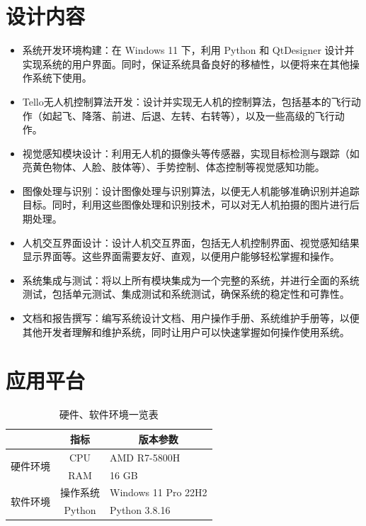 \documentclass[report, twoside, UTF8, AutoFakeBold = 1, AutoFakeSlant, zihao = -4]{config}
\begin{document}
\section{设计内容}

\begin{itemize}
    \item 系统开发环境构建：在 Windows 11 下，利用 Python 和 QtDesigner 设计并实现系统的用户界面。同时，保证系统具备良好的移植性，以便将来在其他操作系统下使用。

    \item Tello无人机控制算法开发：设计并实现无人机的控制算法，包括基本的飞行动作（如起飞、降落、前进、后退、左转、右转等），以及一些高级的飞行动作。
    
    \item 视觉感知模块设计：利用无人机的摄像头等传感器，实现目标检测与跟踪（如亮黄色物体、人脸、肢体等）、手势控制、体态控制等视觉感知功能。
    
    \item 图像处理与识别：设计图像处理与识别算法，以便无人机能够准确识别并追踪目标。同时，利用这些图像处理和识别技术，可以对无人机拍摄的图片进行后期处理。
    
    \item 人机交互界面设计：设计人机交互界面，包括无人机控制界面、视觉感知结果显示界面等。这些界面需要友好、直观，以便用户能够轻松掌握和操作。
    
    \item 系统集成与测试：将以上所有模块集成为一个完整的系统，并进行全面的系统测试，包括单元测试、集成测试和系统测试，确保系统的稳定性和可靠性。
    
    \item 文档和报告撰写：编写系统设计文档、用户操作手册、系统维护手册等，以便其他开发者理解和维护系统，同时让用户可以快速掌握如何操作使用系统。
\end{itemize}

\section{应用平台}

\begin{table}[H]
  \centering
  \caption{硬件、软件环境一览表}
  \label{tab:soft-hardware}
  \begin{tabular}{@{}lcl@{}}
    \toprule[1.5pt]
                              & 指标     & \multicolumn{1}{c}{版本参数} \\ \midrule[0.8pt]
    \multirow{2}{*}{硬件环境} & CPU      & AMD R7-5800H               \\ \cmidrule[0.8pt](l){2-3}
                              & RAM      & 16 GB                         \\ \midrule[0.8pt]
    \multirow{2}{*}{软件环境} & 操作系统 & Windows 11 Pro 22H2 \\ \cmidrule[0.8pt](l){2-3}
                              & Python   & Python 3.8.16                 \\ \bottomrule[1.5pt]
  \end{tabular}
\end{table}
\end{document}
